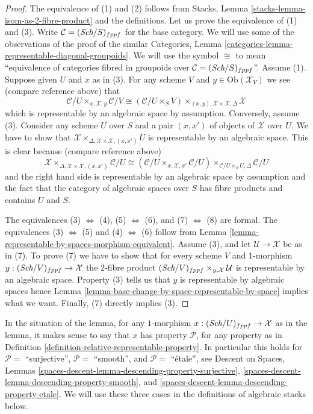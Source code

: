 \begin{proof}
The equivalence of (1) and (2) follows from
Stacks, Lemma \ref{stacks-lemma-isom-as-2-fibre-product}
and the definitions.
Let us prove the equivalence of (1) and (3).
Write $\mathcal{C} = (\textit{Sch}/S)_{fppf}$ for the base category.
We will use some of the observations of the proof of the similar
Categories, Lemma \ref{categories-lemma-representable-diagonal-groupoids}.
We will use the symbol $\cong$ to mean ``equivalence of categories fibred
in groupoids over $\mathcal{C} = (\textit{Sch}/S)_{fppf}$''.
Assume (1). Suppose given $U$ and $x$ as in (3). For any scheme $V$
and $y \in \text{Ob}(\mathcal{X}_V)$ we see (compare reference above) that
$$
\mathcal{C}/U
\times_{x, \mathcal{X}, y}
\mathcal{C}/V
\cong
(\mathcal{C}/U\times_S V)
\times_{(x, y), \mathcal{X} \times \mathcal{X}, \Delta}
\mathcal{X}
$$
which is representable by an algebraic space by assumption. Conversely,
assume (3). Consider any scheme $U$ over $S$ and a pair $(x, x')$
of objects of $\mathcal{X}$ over $U$. We have to show that
$\mathcal{X} \times_{\Delta, \mathcal{X} \times \mathcal{X}, (x, x')} U$
is representable by an algebraic space. This is clear because
(compare reference above)
$$
\mathcal{X}
\times_{\Delta, \mathcal{X} \times \mathcal{X}, (x, x')}
\mathcal{C}/U
\cong
(\mathcal{C}/U \times_{x, \mathcal{X}, x'} \mathcal{C}/U)
\times_{\mathcal{C}/U \times_S U, \Delta}
\mathcal{C}/U
$$
and the right hand side is representable by an algebraic space by assumption
and the fact that the category of algebraic spaces over $S$ has fibre products
and contains $U$ and $S$.

\medskip\noindent
The equivalences
(3) $\Leftrightarrow$ (4),
(5) $\Leftrightarrow$ (6),
and
(7) $\Leftrightarrow$ (8)
are formal. The equivalences
(3) $\Leftrightarrow$ (5) and
(4) $\Leftrightarrow$ (6)
follow from
Lemma \ref{lemma-representable-by-spaces-morphism-equivalent}.
Assume (3), and let $\mathcal{U} \to \mathcal{X}$ be as in (7).
To prove (7) we have to show that for every scheme $V$ and $1$-morphism
$y : (\textit{Sch}/V)_{fppf} \to \mathcal{X}$ the $2$-fibre product
$(\textit{Sch}/V)_{fppf} \times_{y, \mathcal{X}} \mathcal{U}$
is representable by an algebraic space. Property (3) tells us
that $y$ is representable by algebraic spaces hence
Lemma \ref{lemma-base-change-by-space-representable-by-space}
implies what we want. Finally, (7) directly implies (3).
\end{proof}

\noindent
In the situation of the lemma, for any $1$-morphism
$x : (\textit{Sch}/U)_{fppf} \to \mathcal{X}$ as in the lemma, it makes sense
to say that $x$ has property $\mathcal{P}$, for any property as in 
Definition \ref{definition-relative-representable-property}.
In particular this holds for
$\mathcal{P} = $ ``surjective'',
$\mathcal{P} = $ ``smooth'', and
$\mathcal{P} = $ ``\'etale'',
see
Descent on Spaces,
Lemmas \ref{spaces-descent-lemma-descending-property-surjective},
\ref{spaces-descent-lemma-descending-property-smooth}, and
\ref{spaces-descent-lemma-descending-property-etale}.
We will use these three cases in the definitions
of algebraic stacks below. 








